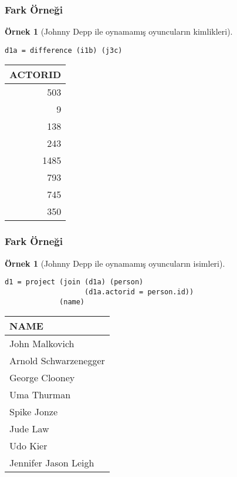 \documentclass[dvipsnames]{beamer}
\theoremstyle{definition}
\theoremstyle{example}
\newtheorem{ornek}[theorem]{Örnek}
\theoremstyle{plain}
\begin{document}
\begin{frame}[fragile]
  \frametitle{Fark Örneği}

  \begin{ornek}[Johnny Depp ile oynamamış oyuncuların kimlikleri]
    \begin{lstlisting}
d1a = difference (i1b) (j3c)
    \end{lstlisting}

    \pause
    \begin{tiny}
    \begin{table}
      \begin{tabular}{|r|}\hline
ACTORID\\\hline\hline
    503\\\hline
      9\\\hline
    138\\\hline
    243\\\hline
   1485\\\hline
    793\\\hline
    745\\\hline
    350\\\hline
      \end{tabular}
    \end{table}
    \end{tiny}
  \end{ornek}
\end{frame}

\begin{frame}[fragile]
  \frametitle{Fark Örneği}

  \begin{ornek}[Johnny Depp ile oynamamış oyuncuların isimleri]
    \begin{lstlisting}
d1 = project (join (d1a) (person)
                   (d1a.actorid = person.id))
             (name)
    \end{lstlisting}

    \pause
    \begin{tiny}
    \begin{table}
      \begin{tabular}{|l|}\hline
NAME                 \\\hline\hline
John Malkovich       \\\hline
Arnold Schwarzenegger\\\hline
George Clooney       \\\hline
Uma Thurman          \\\hline
Spike Jonze          \\\hline
Jude Law             \\\hline
Udo Kier             \\\hline
Jennifer Jason Leigh \\\hline
      \end{tabular}
    \end{table}
    \end{tiny}
  \end{ornek}
\end{frame}
\end{document}
